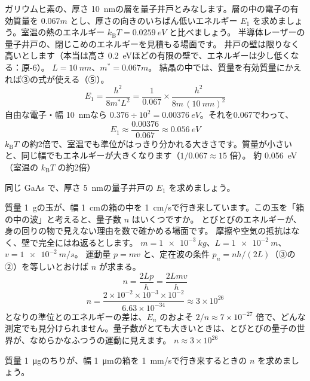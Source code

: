 \label{ph:原-5:ex6}
\begin{phreidai}
ガリウムヒ素の、厚さ \qty{10}{nm}の層を量子井戸とみなします。層の中の電子の有効質量を $0.067m$ とし、厚さの向きのいちばん低いエネルギー $E_1$ を求めましょう。室温の熱のエネルギー $k_{\mathrm B}T=\qty{0.0259}{eV}$ と比べましょう。
\phbamen
半導体レーザーの量子井戸の、閉じこめのエネルギーを見積もる場面です。
\phmushi
井戸の壁は限りなく高いとします（本当は高さ \qty{0.2}{eV}ほどの有限の壁で、エネルギーは少し低くなる：原-6）。
\phzu
$L=\qty{10}{nm}$、$m^*=0.067m$。
\phriyu
結晶の中では、質量を有効質量にかえれば③の式が使える（⑤）。
\phtateru
\[E_1=\frac{h^2}{8m^*L^2}=\frac{1}{0.067}\times\frac{h^2}{8m\,(\qty{10}{nm})^2}\]
\phtoku
自由な電子・幅 \qty{10}{nm}なら $0.376\div10^2=\qty{0.00376}{eV}$。それを0.067でわって、
\[E_1\approx\frac{0.00376}{0.067}\approx\qty{0.056}{eV}\]
\phtashikame
$k_{\mathrm B}T$ の約2倍で、室温でも準位がはっきり分かれる大きさです。質量が小さいと、同じ幅でもエネルギーが大きくなります（$1/0.067\approx15$ 倍）。
\kotae 約 \qty{0.056}{eV}（室温の $k_{\mathrm B}T$ の約2倍）
\end{phreidai}
\begin{jibun}
同じ GaAs で、厚さ \qty{5}{nm}の量子井戸の $E_1$ を求めましょう。
\end{jibun}

\label{ph:原-5:ex7}
\begin{phreidai}
質量 \qty{1}{g}の玉が、幅 \qty{1}{cm}の箱の中を \qty{1}{cm/s}で行き来しています。この玉を「箱の中の波」と考えると、量子数 $n$ はいくつですか。
\phbamen
とびとびのエネルギーが、身の回りの物で見えない理由を数で確かめる場面です。
\phmushi
摩擦や空気の抵抗はなく、壁で完全にはね返るとします。
\phzu
$m=\qty{1e-3}{kg}$、$L=\qty{1e-2}{m}$、$v=\qty{1e-2}{m/s}$。
\phriyu
運動量 $p=mv$ と、定在波の条件 $p_n=nh/(2L)$（③の②）を等しいとおけば $n$ が求まる。
\phtateru
\[n=\frac{2Lp}{h}=\frac{2Lmv}{h}\]
\phtoku
\[n=\frac{2\times10^{-2}\times10^{-3}\times10^{-2}}{6.63\times10^{-34}}\approx3\times10^{26}\]
\phtashikame
となりの準位とのエネルギーの差は、$E_n$ のおよそ $2/n\approx7\times10^{-27}$ 倍で、どんな測定でも見分けられません。量子数がとても大きいときは、とびとびの量子の世界が、なめらかなふつうの運動に見えます。
\kotae $n\approx3\times10^{26}$
\end{phreidai}
\begin{jibun}
質量 \qty{1}{\micro g}のちりが、幅 \qty{1}{\micro m}の箱を \qty{1}{mm/s}で行き来するときの $n$ を求めましょう。
\end{jibun}

